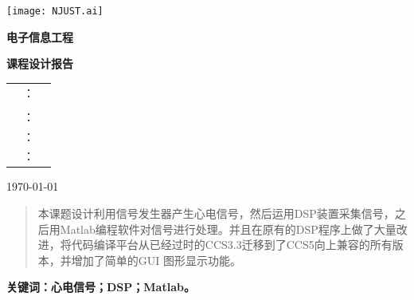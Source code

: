 \documentclass{article}
\begin{document}

\begin{titlepage}
	\centering

	\texttt{[image: NJUST.ai]}

	\vspace{10mm}

	\textbf{\heiti{}电子信息工程}

	\textbf{\heiti{}课程设计报告}

	\vspace{10mm}

	\begin{spacing}{2}

		\centering

		\begin{tabu}to.8
			 & ：&\underline{}\\
			\makebox[4\ccwd][s]{}     & &\underline{}\\
			 & ：&\underline{}\\
			 & ：&\underline{}\\
			 & ：&\underline{}\\
		\end{tabu}

		\vspace{0mm}%

	\end{spacing}

	\today

	\vspace{0mm}%

\end{titlepage}


\renewcommand{\abstractname}{\Large 摘要}
\begin{abstract}
	本课题设计利用信号发生器产生心电信号，然后运用DSP装置采集信号，之后用Matlab编程软件对信号进行处理。并且在原有的DSP程序上做了大量改进，将代码编译平台从已经过时的CCS3.3迁移到了CCS5向上兼容的所有版本，并增加了简单的GUI 图形显示功能。
\end{abstract}

\textbf{关键词：心电信号；DSP；Matlab。}
\end{document}
